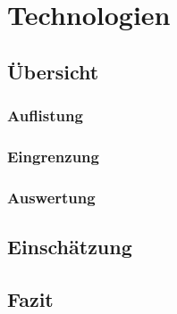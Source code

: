 \section{Technologien}
\subsection{Übersicht}
\subsubsection{Auflistung}%
\subsubsection{Eingrenzung}%
\subsubsection{Auswertung}%
\subsection{Einschätzung}%
\subsection{Fazit}%